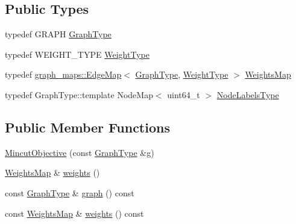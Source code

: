\subsection*{Public Types}
\begin{DoxyCompactItemize}
\item 
typedef G\+R\+A\+PH \hyperlink{classnifty_1_1graph_1_1opt_1_1mincut_1_1MincutObjective_a3dbd0ae2a00c363dea7dcf771d0269dc}{Graph\+Type}
\item 
typedef W\+E\+I\+G\+H\+T\+\_\+\+T\+Y\+PE \hyperlink{classnifty_1_1graph_1_1opt_1_1mincut_1_1MincutObjective_aad59126994a666c8e02a71717dcffab8}{Weight\+Type}
\item 
typedef \hyperlink{structnifty_1_1graph_1_1graph__maps_1_1EdgeMap}{graph\+\_\+maps\+::\+Edge\+Map}$<$ \hyperlink{classnifty_1_1graph_1_1opt_1_1mincut_1_1MincutObjective_a3dbd0ae2a00c363dea7dcf771d0269dc}{Graph\+Type}, \hyperlink{classnifty_1_1graph_1_1opt_1_1mincut_1_1MincutObjective_aad59126994a666c8e02a71717dcffab8}{Weight\+Type} $>$ \hyperlink{classnifty_1_1graph_1_1opt_1_1mincut_1_1MincutObjective_a012cbd01da7133bf0824f41af40adafb}{Weights\+Map}
\item 
typedef Graph\+Type\+::template Node\+Map$<$ uint64\+\_\+t $>$ \hyperlink{classnifty_1_1graph_1_1opt_1_1mincut_1_1MincutObjective_af4e063aab4bfc02427e36be62091d18f}{Node\+Labels\+Type}
\end{DoxyCompactItemize}
\subsection*{Public Member Functions}
\begin{DoxyCompactItemize}
\item 
\hyperlink{classnifty_1_1graph_1_1opt_1_1mincut_1_1MincutObjective_a2e74ce9b57192b6ada8a37039a65de48}{Mincut\+Objective} (const \hyperlink{classnifty_1_1graph_1_1opt_1_1mincut_1_1MincutObjective_a3dbd0ae2a00c363dea7dcf771d0269dc}{Graph\+Type} \&g)
\item 
\hyperlink{classnifty_1_1graph_1_1opt_1_1mincut_1_1MincutObjective_a012cbd01da7133bf0824f41af40adafb}{Weights\+Map} \& \hyperlink{classnifty_1_1graph_1_1opt_1_1mincut_1_1MincutObjective_a7d61f27a21fa2c77a1d76d23e83ef821}{weights} ()
\item 
const \hyperlink{classnifty_1_1graph_1_1opt_1_1mincut_1_1MincutObjective_a3dbd0ae2a00c363dea7dcf771d0269dc}{Graph\+Type} \& \hyperlink{classnifty_1_1graph_1_1opt_1_1mincut_1_1MincutObjective_a48802d53c3951d1ab1af4f33be8260c5}{graph} () const
\item 
const \hyperlink{classnifty_1_1graph_1_1opt_1_1mincut_1_1MincutObjective_a012cbd01da7133bf0824f41af40adafb}{Weights\+Map} \& \hyperlink{classnifty_1_1graph_1_1opt_1_1mincut_1_1MincutObjective_a473e0dbc73e118e539ec0e690f41b6c8}{weights} () const
\end{DoxyCompactItemize}



